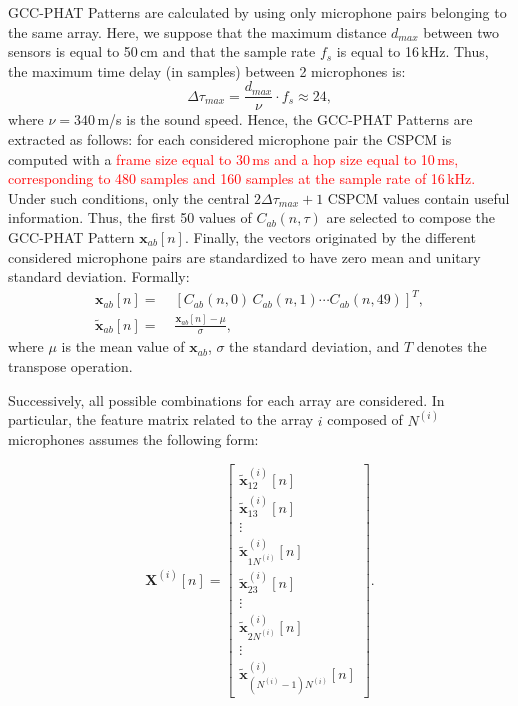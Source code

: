 \documentclass[review]{elsarticle}
\begin{document}
GCC-PHAT Patterns are calculated by using only microphone pairs belonging to the same array. Here, we suppose that the maximum distance $d_{max}$ between two sensors is equal to  50\,cm and that the sample rate $f_s$ is equal to 16\,kHz. Thus, the maximum time delay (in samples) between 2 microphones is:
\begin{equation}
\label{eq:TOA}
\Delta\tau_{max} = \frac{d_{max}}{\nu} \cdot f_s \approx 24,
\end{equation} 
where $\nu=340$\,m/s is the sound speed.
Hence, the GCC-PHAT Patterns are extracted as follows: for each considered microphone pair the CSPCM is computed with a \textcolor{red}{frame size equal to 30\,ms and a hop size equal to 10\,ms, corresponding to 480 samples and 160 samples at the sample rate of 16\,kHz.} %
Under such conditions, only the central $2\Delta\tau_{max} + 1$ CSPCM values contain useful information. Thus, the first 50 values of $C_{ab}(n,\tau)$ are selected to compose the GCC-PHAT Pattern $\mathbf{x}_{ab}[n]$. 
Finally, the vectors originated by the different considered microphone pairs are standardized to have zero mean and unitary standard deviation.
Formally: 
\begin{align}
\mathbf{x}_{ab}[n] = & \;  [C_{ab}(n,0)\,C_{ab}(n,1) \cdots C_{ab}(n,49)]^T,\\
\tilde{\mathbf{x}}_{ab}[n] =  & \;  \frac{\mathbf{x}_{ab}[n] - \mu}{\sigma}, \label{eq:gcc_pattern}
\end{align}
where $\mu$ is the mean value of $\mathbf{x}_{ab}$, $\sigma$ the standard deviation, and $T$ denotes the transpose operation.

Successively, all possible combinations for each array are considered. In particular, the feature matrix related to the array $i$ composed of $N^{(i)}$ microphones assumes the following form:

\begin{equation}
\mathbf{X}^{(i)}[n] =   \begin{bmatrix} \tilde{\mathbf{x}}_{12}^{(i)}[n] \\ \tilde{\mathbf{x}}_{13}^{(i)}[n] \\ \vdots\\ \tilde{\mathbf{x}}_{1N^{(i)}}^{(i)}[n] \\ \tilde{\mathbf{x}}_{23}^{(i)}[n] \\\vdots \\ \tilde{\mathbf{x}}_{2N^{(i)}}^{(i)}[n] \\ \vdots \\  \tilde{\mathbf{x}}_{(N^{(i)}-1)N^{(i)}}^{(i)}[n] \end{bmatrix}.
\end{equation}
\end{document}
